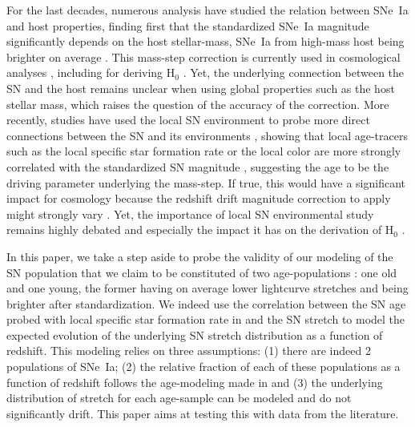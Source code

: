 \documentclass[]{aa} %
\newcommand{\nn}[1]{{\textcolor[rgb]{1, 0.27, 0}{#1}}}
\begin{document}
For the last decades, numerous analysis have studied the relation between SNe~Ia
and host properties\nn{,} finding first that the standardized SNe~Ia magnitude
significantly depends on the host stellar-mass, SNe~Ia from high-mass host
\nn{being brighter on average}
\cite[e.g.][]{kelly2010,sullivan2010,childress2013,betoule2014,rigault2018}.
This mass-step correction is currently used in cosmological analyses
\citep[e.g.][]{betoule2014,scolnic2018a}, including for deriving H$_0$
\citep{riess2016,riess2019}. Yet, the underlying connection between the SN and
the host remains unclear when using global properties such as the host stellar
mass, which raises the question of the accuracy of the correction. More
recently, studies have used the local SN environment to probe more direct
connections between the SN and its environments \citep{rigault2013}\nn{,}
showing that local age-tracers such as the local specific star formation rate or
the local color are more strongly correlated with the standardized SN magnitude
\citep{rigault2018,roman2018}, suggesting the age to be the driving parameter
underlying the mass-step. If true, this would have a significant impact for
cosmology because the redshift drift magnitude correction to apply might
strongly vary \citep{rigault2013,childress2014,scolnic2018a}.  Yet, the
importance of local SN environmental study remains highly debated
\cite[e.g.][]{jones2015,jones2019} and especially the impact it has on the
derivation of H$_0$ \cite{jones2015,riess2016,riess2018,rose2019}. 

In this paper, we take a step aside to probe the validity of our modeling of the
SN population that we claim to be constituted of two age-populations
\citep{rigault2013,rigault2015,rigault2018}: one old and one young, the former
having on average lower lightcurve stretches and being brighter after
standardization. We indeed use the correlation between the SN age probed with
local specific star formation rate in \cite{rigault2018} and the SN stretch to
model the expected evolution of the underlying SN stretch distribution as a
function of redshift. This modeling relies on three assumptions: (1) there
\nn{are indeed} 2 populations of SNe~Ia; (2) the relative fraction of each of
these populations as a function of redshift follows the age-modeling made in
\citep{rigault2018} and (3) the underlying distribution of stretch for each
age-sample can be modeled and do not significantly drift. This paper aims at
testing this with data from the literature. 
\end{document}
